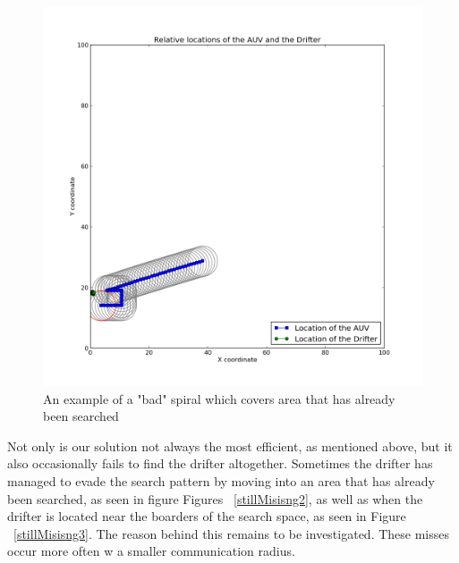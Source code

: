 \documentclass[a4paper, 11pt]{article} %
\begin{document}
\begin{figure}[H]
	\begin{center}
		\includegraphics[scale=0.30]{bad_spiral.png}
		\vspace{-20pt}
	\end{center}
\caption{An example of a "bad" spiral which covers area that has already been searched \label{badSpiral}}
\end{figure}

\noindent Not only is our solution not always the most efficient, as mentioned above, but it also occasionally fails to find the drifter altogether. Sometimes the drifter has managed to evade the search pattern by moving into an area that has already been searched, as seen in figure Figures ~\ref{stillMisisng2}, as well as when the drifter is located near the boarders of the search space, as seen in Figure ~\ref{stillMisisng3}. The reason behind this remains to be investigated. These misses occur more often w a smaller communication radius.
\end{document}
